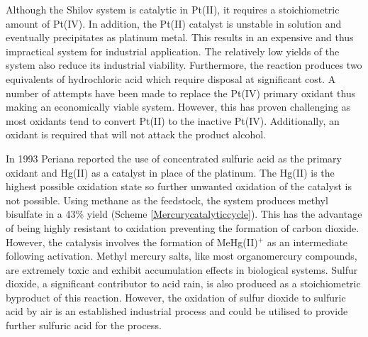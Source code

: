 Although the Shilov system is catalytic in Pt(II), it requires a stoichiometric amount of Pt(IV).  In addition, the Pt(II) catalyst is unstable in solution and eventually precipitates as platinum metal.\cite{Luinstra1995}  This results in an expensive and thus impractical system for industrial application.  The relatively low yields of the system also reduce its industrial viability.\cite{Periana1993}  Furthermore, the reaction produces two equivalents of hydrochloric acid which require disposal at significant cost.\cite{Poliakoff2001}  A number of attempts have been made to replace the Pt(IV) primary oxidant thus making an economically viable system.\cite{Periana1993, Periana1998, Hashiguchi2010}  However, this has proven challenging as most oxidants tend to convert Pt(II) to the inactive Pt(IV).\cite{Crabtree2001}  Additionally, an oxidant is required that will not attack the product alcohol.  

In 1993 Periana reported the use of concentrated sulfuric acid as the primary oxidant and Hg(II) as a catalyst in place of the platinum.\cite{Periana1993}  The Hg(II) is the highest possible oxidation state so further unwanted oxidation of the catalyst is not possible.  Using methane as the feedstock, the system produces methyl bisulfate in a 43\% yield (Scheme \ref{Mercurycatalyticcycle}).  This has the advantage of being highly resistant to oxidation preventing the formation of carbon dioxide. However, the catalysis involves the formation of MeHg(II)$^+$ as an intermediate following activation.  Methyl mercury salts, like most organomercury compounds, are extremely toxic and exhibit accumulation effects in biological systems.  Sulfur dioxide, a significant contributor to acid rain,\cite{Jacobs1999} is also produced as a stoichiometric byproduct of this reaction.  However, the oxidation of sulfur dioxide to sulfuric acid by air is an established industrial process and could be utilised to provide further sulfuric acid for the process.\cite{Periana1993}



